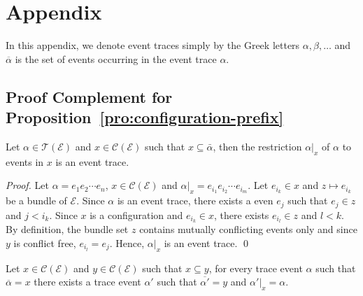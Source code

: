 \documentclass{llncs}
\newcommand{\C}{\mathcal{C}}
\newcommand{\TT}{\mathcal{T}}
\newcommand{\EE}{\mathcal{E}}
\newcommand{\<}{\langle}
\renewcommand{\>}{\rangle}
\newcommand{\ov}[1]{\overline{#1}}
\begin{document}



\newpage
\clearpage{}\section*{Appendix}

\renewenvironment{theorem}[2][Theorem]{\begin{trivlist}
\item[\hskip \labelsep {\bfseries #1}\hskip \labelsep {\bfseries #2}]}{\end{trivlist}}
\newenvironment{repproposition}[2][Proposition]{\begin{trivlist}
\item[\hskip \labelsep {\bfseries #1}\hskip \labelsep {\bfseries #2}]}{\end{trivlist}}

In this appendix, we denote event traces simply by the Greek letters $\alpha,\beta,\dots$ and $\ov\alpha$ is the set of events occurring in the event trace $\alpha$. 

\subsection{Proof Complement for Proposition~\ref{pro:configuration-prefix}}



\begin{lemma}\label{pro:trace-restriction}
Let $\alpha\in\TT(\EE)$ and $x\in\C(\EE)$ such that $x\subseteq\bar\alpha$, then the restriction $\alpha|_{x}$ of $\alpha$ to events in $x$ is an event trace.
\end{lemma}

\begin{proof}
Let $\alpha = e_1e_2\cdots e_n$, $x\in\C(\EE)$ and $\alpha|_{x} = e_{i_1}e_{i_2}\cdots e_{i_m}$. Let $e_{i_k}\in x$ and $z\mapsto e_{i_k}$ be a bundle of $\EE$. Since $\alpha$ is an event trace, there exists a even $e_j$ such that $e_j\in z$ and $j<i_k$. Since $x$ is a configuration and $e_{i_k}\in x$, there exists $e_{i_l}\in z$ and $l<k$. By definition, the bundle set $z$ contains mutually conflicting events only and since $y$ is conflict free, $e_{i_l} = e_j$. Hence, $\alpha|_{x}$ is an event trace.  \qed
\end{proof}

\begin{lemma}\label{pro:trace-extension}
Let $x\in\C(\EE)$ and $y\in\C(\EE)$ such that $x\subseteq y$, for every trace event $\alpha$ such that $\ov\alpha = x$ there exists a trace event $\alpha'$ such that $\ov{\alpha'} = y$ and $\alpha'|_{x} = \alpha$.
\end{lemma}
\end{document}
